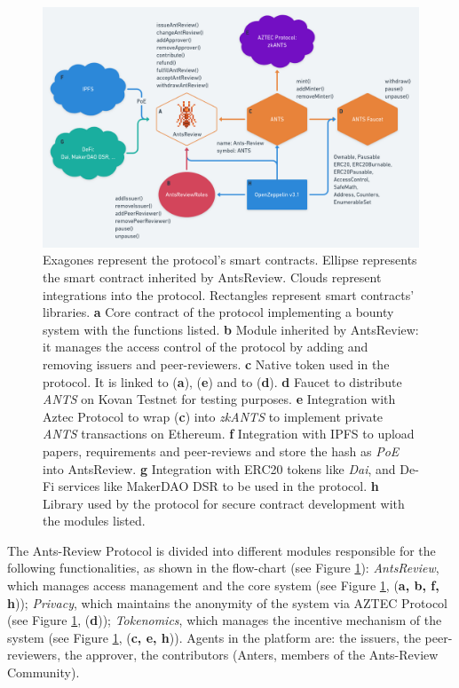 \documentclass[runningheads]{llncs}
\begin{document}
\begin{figure}
\centering
\includegraphics[scale=0.28]{AntsReview}
\small{
\caption{Exagones represent the protocol's smart contracts. Ellipse represents the smart contract inherited by AntsReview. Clouds represent integrations into the protocol. Rectangles represent smart contracts' libraries.
\textbf{a} Core contract of the protocol implementing a bounty system with the functions listed.
\textbf{b} Module inherited by AntsReview: it manages the access control of the protocol by adding and removing issuers and peer-reviewers.
\textbf{c} Native token used in the protocol. It is linked to (\textbf{a}), (\textbf{e}) and to (\textbf{d}).
\textbf{d} Faucet to distribute \emph{ANTS} on Kovan Testnet for testing purposes. 
\textbf{e} Integration with Aztec Protocol to wrap (\textbf{c}) into \emph{zkANTS} to implement private \emph{ANTS} transactions on Ethereum.
\textbf{f} Integration with IPFS to upload papers, requirements and peer-reviews and store the hash as \emph{PoE} into AntsReview.
\textbf{g} Integration with ERC20 tokens like \emph{Dai}, and De-Fi services like MakerDAO DSR to be used in the protocol.
\textbf{h} Library used by the protocol for secure contract development with the modules listed.}}
\label{fig:contracts}
\end{figure}

\newline The Ants-Review Protocol is divided into different modules responsible for the following functionalities, as shown in the flow-chart (see Figure \ref{fig:contracts}):
\emph{AntsReview}, which manages access management and the core system (see Figure \ref{fig:contracts}, (\textbf{a, b, f, h}));
\emph{Privacy}, which maintains the anonymity of the system via AZTEC Protocol (see Figure  \ref{fig:contracts}, (\textbf{d}));
\emph{Tokenomics}, which manages the incentive mechanism of the system (see Figure \ref{fig:contracts}, (\textbf{c, e, h})). \newline Agents in the platform are: the issuers, the peer-reviewers, the approver, the contributors (Anters, members of the Ants-Review Community).
\end{document}
